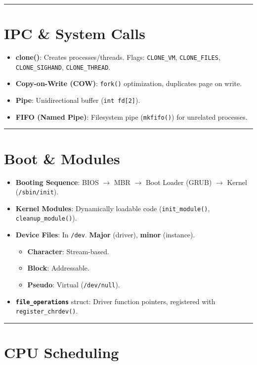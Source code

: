 \documentclass[8pt,a4paper]{article}
\newcommand{\sectiondivider}{\vspace{4pt}\hrule\vspace{4pt}}
\begin{document}
\begin{multicols}{2}
\sectiondivider
\section*{IPC \& System Calls}
\begin{itemize}
    \item \textbf{clone()}: Creates processes/threads. Flags: \texttt{CLONE\_VM}, \texttt{CLONE\_FILES}, \texttt{CLONE\_SIGHAND}, \texttt{CLONE\_THREAD}.
    \item \textbf{Copy-on-Write (COW)}: \texttt{fork()} optimization, duplicates page on write.
    \item \textbf{Pipe}: Unidirectional buffer (\texttt{int fd[2]}).
    \item \textbf{FIFO (Named Pipe)}: Filesystem pipe (\texttt{mkfifo()}) for unrelated processes.
\end{itemize}

\sectiondivider
\section*{Boot \& Modules}
\begin{itemize}
    \item \textbf{Booting Sequence}: BIOS $\to$ MBR $\to$ Boot Loader (GRUB) $\to$ Kernel (\texttt{/sbin/init}).
    \item \textbf{Kernel Modules}: Dynamically loadable code (\texttt{init\_module()}, \texttt{cleanup\_module()}).
    \item \textbf{Device Files}: In \texttt{/dev}. \textbf{Major} (driver), \textbf{minor} (instance).
        \begin{itemize}
            \item \textbf{Character}: Stream-based.
            \item \textbf{Block}: Addressable.
            \item \textbf{Pseudo}: Virtual (\texttt{/dev/null}).
        \end{itemize}
    \item \textbf{\texttt{file\_operations}} struct: Driver function pointers, registered with \texttt{register\_chrdev()}.
\end{itemize}

\sectiondivider
\section*{CPU Scheduling}

\end{multicols}
\end{document}
